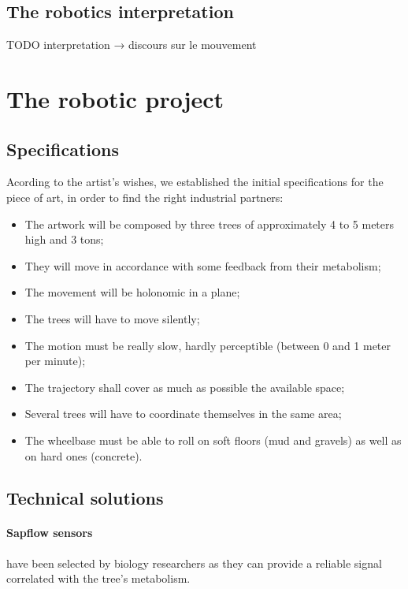 \documentclass[letterpaper, 10 pt, conference]{IEEEtran}
\begin{document}
\subsection{The robotics interpretation}

TODO interpretation → discours sur le mouvement

\section{The robotic project}
\subsection{Specifications}

Acording to the artist's wishes, we established the initial specifications for the piece of art, in order to find the right industrial partners:

\begin{itemize}
    \item The artwork will be composed by three trees of approximately 4 to 5 meters high and 3 tons;
    \item They will move in accordance with some feedback from their metabolism;
    \item The movement will be holonomic in a plane;
    \item The trees will have to move silently;
    \item The motion must be really slow, hardly perceptible (between 0 and 1 meter per minute);
    \item The trajectory shall cover as much as possible the available space;
    \item Several trees will have to coordinate themselves in the same area;
    \item The wheelbase must be able to roll on soft floors (mud and gravels) as well as on hard ones (concrete).
\end{itemize}

\subsection{Technical solutions}

\paragraph{Sapflow sensors} have been selected by biology researchers as they can provide a reliable signal correlated with the tree's metabolism.
\end{document}
